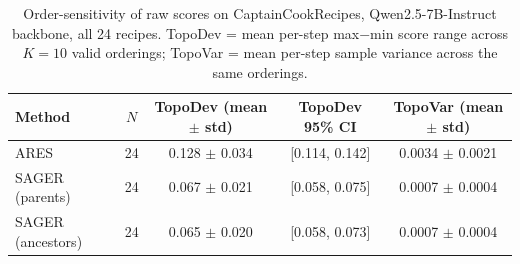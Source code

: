 %
%

\begin{table}[h]
\centering
\caption{Order-sensitivity of raw scores on CaptainCookRecipes,
  Qwen2.5-7B-Instruct backbone, all 24 recipes.
  TopoDev = mean per-step max$-$min score range across $K=10$ valid orderings;
  TopoVar = mean per-step sample variance across the same orderings.}\label{tab:sager-qwen-topodev}
\begin{tabular}{lcccc}
\toprule
Method & $N$ & TopoDev (mean $\pm$ std) & TopoDev 95\% CI & TopoVar (mean $\pm$ std) \\
\midrule
ARES               & 24 & 0.128 $\pm$ 0.034 & [0.114, 0.142] & 0.0034 $\pm$ 0.0021 \\
SAGER (parents)     & 24 & 0.067 $\pm$ 0.021 & [0.058, 0.075] & 0.0007 $\pm$ 0.0004 \\
SAGER (ancestors)   & 24 & 0.065 $\pm$ 0.020 & [0.058, 0.073] & 0.0007 $\pm$ 0.0004 \\
\bottomrule
\end{tabular}
\end{table}


